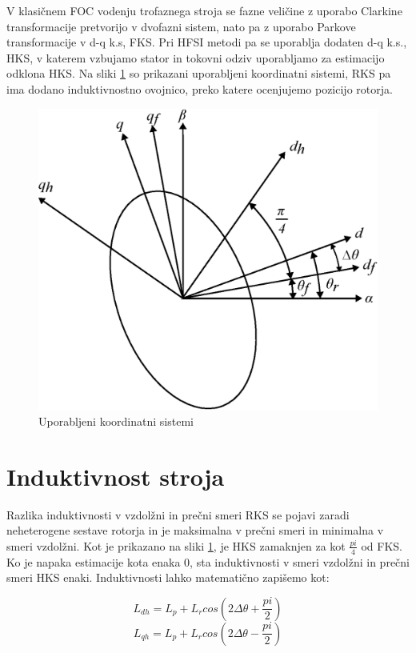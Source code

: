 \documentclass[a4paper,twoside,openright,12pt,slovene]{book}
\begin{document}
V klasičnem FOC vodenju trofaznega stroja se fazne veličine z uporabo Clarkine transformacije pretvorijo v dvofazni sistem, nato pa z uporabo Parkove transformacije v d-q k.s, FKS. Pri HFSI metodi pa se
uporablja dodaten d-q k.s., HKS, v katerem vzbujamo stator in tokovni odziv uporabljamo za estimacijo odklona HKS. Na sliki \ref{koordinatniSistem} so prikazani uporabljeni koordinatni sistemi, RKS pa
ima dodano induktivnostno ovojnico, preko katere ocenjujemo pozicijo rotorja.

\begin{figure}[!htbp]
    \centering
    \includegraphics[width=0.9\columnwidth]{Slike/Inkscape/koordinatniSistem.eps}
    \caption{\label{koordinatniSistem} Uporabljeni koordinatni sistemi}
\end{figure}

\section{Induktivnost stroja}
Razlika induktivnosti v vzdolžni in prečni smeri RKS se pojavi zaradi neheterogene sestave rotorja in je maksimalna v prečni smeri in minimalna v smeri vzdolžni. Kot je prikazano na sliki
\ref{koordinatniSistem}, je HKS zamaknjen za kot $\frac{pi}{4}$ od FKS. Ko je napaka estimacije kota enaka 0, sta induktivnosti v smeri vzdolžni in prečni smeri HKS enaki. Induktivnosti lahko
matematično zapišemo kot:

\begin{equation}
    L_{dh} = L_p + L_r cos(2\Delta\theta + \frac{pi}{2})
\end{equation}
\begin{equation}
    L_{qh} = L_p + L_r cos(2\Delta\theta - \frac{pi}{2})
\end{equation}
\end{document}
